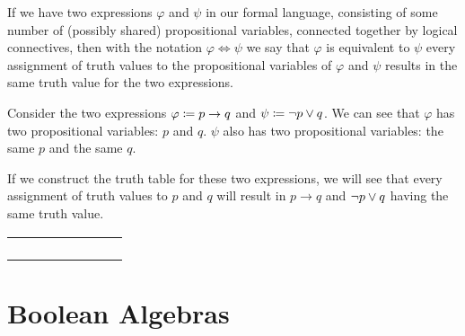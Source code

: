 \begin{definition}[Equivalence]
    If we have two expressions $\varphi$ and $\psi$ in our formal language,
    consisting of some number of (possibly shared) propositional variables, connected together by logical connectives,
    then with the notation $\varphi \iff \psi$ we say that $\varphi$ is equivalent to $\psi$
    \iffbydefn every assignment of truth values to the propositional variables of $\varphi$ and $\psi$ results
    in the same truth value for the two expressions.
\end{definition}
\begin{example}
    Consider the two expressions $\varphi \coloneqq p \rightarrow q$ and $\psi \coloneqq \neg p \vee q$.
    We can see that $\varphi$ has two propositional variables: $p$ and $q$.
    $\psi$ also has two propositional variables: the same $p$ and the same $q$.

    If we construct the truth table for these two expressions,
    we will see that every assignment of truth values to $p$ and $q$ will result in $p \rightarrow q$ and $\neg p \vee q$
    having the same truth value.

    \begin{table}[H]
        \centering
        \begin{tabular}{|CcCc||CcCc|}
            \hline
             &  &  & \\ \hline
            \thead{$\top$} & \thead{$\top$} &  & \\
            \thead{$\top$} & \thead{$\bot$} &  & \\
            \thead{$\bot$} & \thead{$\top$} &  &  \\
            \thead{$\bot$} & \thead{$\bot$} &  &  \\ \hline
        \end{tabular}
    \end{table}
\end{example}

\newpage
\section{Boolean Algebras}

